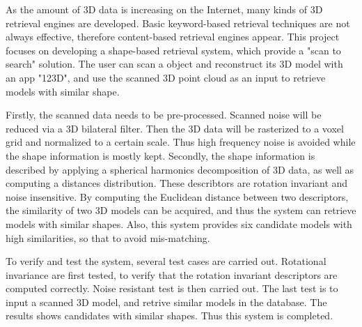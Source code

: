 As the amount of 3D data is increasing on the Internet, many kinds of 3D retrieval engines are developed. Basic keyword-based retrieval techniques are not always effective, therefore content-based retrieval engines appear. This project focuses on developing a shape-based retrieval system, which provide a "scan to search" solution. The user can scan a object and reconstruct its 3D model with an app "123D", and use the scanned 3D point cloud as an input to retrieve models with similar shape. 

Firstly, the scanned data needs to be pre-processed. Scanned noise will be reduced via a 3D bilateral filter. Then the 3D data will be rasterized to a voxel grid and normalized to a certain scale. Thus high frequency noise is avoided while the shape information is mostly kept. Secondly, the shape information is described by applying a spherical harmonics decomposition of 3D data, as well as computing a distances distribution. These describtors are rotation invariant and noise insensitive. By computing the Euclidean distance between two descriptors, the similarity of two 3D models can be acquired, and thus the system can retrieve models with similar shapes. Also, this system provides six candidate models with high similarities, so that to avoid mis-matching. 

To verify and test the system, several test cases are carried out. Rotational invariance are first tested, to verify that the rotation invariant descriptors are computed correctly. Noise resistant test is then carried out. The last test is to input a scanned 3D model, and retrive similar models in the database. The results shows candidates with similar shapes. Thus this system is completed.